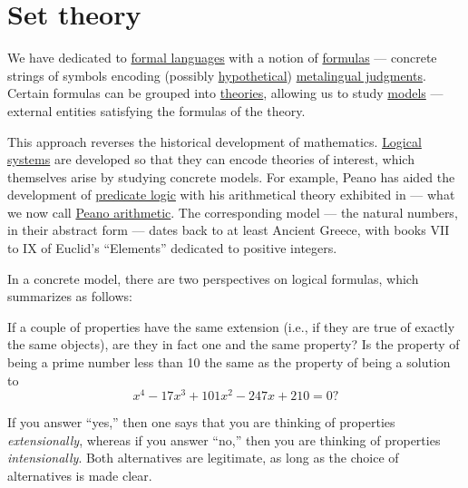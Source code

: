 \chapter{Set theory}\label{ch:set_theory}

We have dedicated  to \hyperref[def:formal_language]{formal languages} with a notion of \hyperref[con:proposition]{formulas} --- concrete strings of symbols encoding (possibly \hyperref[con:hypothetical_judgment]{hypothetical}) \hyperref[con:judgment]{metalingual judgments}. Certain formulas can be grouped into \hyperref[def:logical_theory]{theories}, allowing us to study \hyperref[con:logical_model]{models} --- external entities satisfying the formulas of the theory.

This approach reverses the historical development of mathematics. \hyperref[con:logical_system]{Logical systems} are developed so that they can encode theories of interest, which themselves arise by studying concrete models. For example, Peano has aided the development of \hyperref[con:predicate_logic]{predicate logic} with his arithmetical theory exhibited in \cite{Peano1889ArithmeticesPrincipia} --- what we now call \hyperref[def:peano_arithmetic]{Peano arithmetic}. The corresponding model --- the natural numbers, in their abstract form --- dates back to at least Ancient Greece, with books VII to IX of Euclid's \enquote{Elements} dedicated to positive integers.

In a concrete model, there are two perspectives on logical formulas, which \textcite[125]{Enderton1977SetTheory} summarizes as follows:
\begin{displayquote}
  If a couple of properties have the same extension (i.e., if they are true of exactly the same objects), are they in fact one and the same property? Is the property of being a prime number less than 10 the same
  as the property of being a solution to
  \begin{equation*}
    x^4 - 17x^3 + 101x^2 - 247x + 210 = 0?
  \end{equation*}

  If you answer \enquote{yes,} then one says that you are thinking of properties \textit{extensionally}, whereas if you answer \enquote{no,} then you are thinking of properties \textit{intensionally}. Both alternatives are legitimate, as long as the choice of
  alternatives is made clear.
\end{displayquote}


